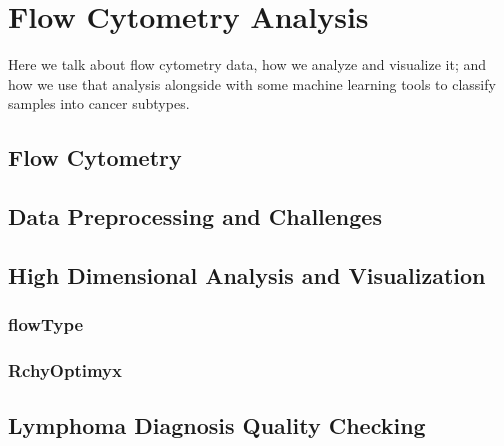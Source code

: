 \chapter{Flow Cytometry Analysis}

Here we talk about flow cytometry data, how we analyze and visualize it; and how we use that analysis alongside with some machine learning tools to classify samples into cancer subtypes.

\section{Flow Cytometry}

\section{Data Preprocessing and Challenges}

\section{High Dimensional Analysis and Visualization}
\subsection{flowType}

\subsection{RchyOptimyx}

\section{Lymphoma Diagnosis Quality Checking}

